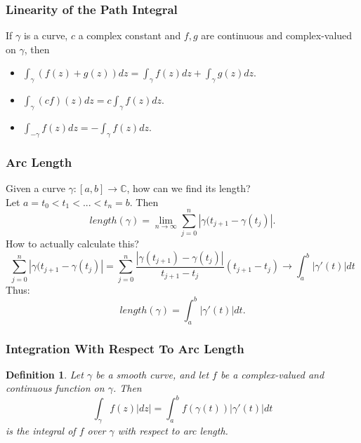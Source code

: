 \documentclass{article}
\newtheorem{definition}{Definition}[section]
\begin{document}
\subsubsection{Linearity of the Path Integral}
If $\gamma$ is a curve, $c$ a complex constant and $f, g$ are continuous and complex-valued on $\gamma$, then
\begin{itemize}
\item $\int_{\gamma} (f(z) + g(z))dz = \int_{\gamma}f(z)dz + \int_{\gamma}g(z)dz$.
\item $\int_{\gamma}(cf)(z)dz = c \int_{\gamma}f(z)dz$.
\item $\int_{-\gamma}f(z)dz = - \int_{\gamma}f(z)dz$.
\end{itemize}

\subsubsection{Arc Length}
Given a curve $\gamma : [a, b] \to \mathbb{C}$, how can we find its length? \\
Let $a = t_0 < t_1 < ... < t_n = b.$ Then 
\begin{equation*}
length(\gamma) = \lim_{n \to \infty} \sum_{j=0}^{n} \left|\gamma (t_{j+1} - \gamma (t_j)\right|.
\end{equation*}
How to actually calculate this?
\begin{equation*}
\sum_{j=0}^{n}\left|\gamma(t_{j+1} - \gamma(t_j)\right| = \sum_{j=0}^{n} \frac{\left|\gamma(t_{j+1}) - \gamma(t_j)\right|}{t_{j+1} - t_j}(t_{j+1} - t_j) \to \int_a^b\left|\gamma '(t)\right|dt
\end{equation*}
Thus:
\begin{equation*}
length(\gamma) = \int_a^b \left|\gamma '(t)\right|dt.
\end{equation*}

\subsubsection{Integration With Respect To Arc Length}
\begin{definition}
Let $\gamma$ be a smooth curve, and let $f$ be a complex-valued and continuous function on $\gamma$. Then
\begin{equation*}
\int_{\gamma} f(z)\left|dz\right| = \int_a^b f(\gamma(t))\left|\gamma'(t)\right|dt
\end{equation*}
is the integral of $f$ over $\gamma$ with respect to arc length.
\end{definition}
\end{document}
